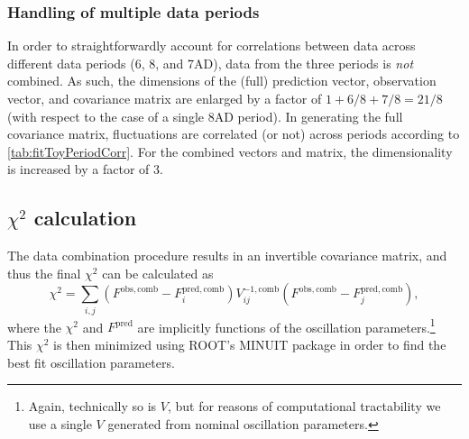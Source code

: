\documentclass[../thesis.tex]{subfiles}
\begin{document}
\subsubsection{Handling of multiple data periods}

In order to straightforwardly account for correlations between data across different data periods (6, 8, and 7AD), data from the three periods is \emph{not} combined. As such, the dimensions of the (full) prediction vector, observation vector, and covariance matrix are enlarged by a factor of $1 + 6/8 + 7/8 = 21/8$ (with respect to the case of a single 8AD period). In generating the full covariance matrix, fluctuations are correlated (or not) across periods according to \autoref{tab:fitToyPeriodCorr}. For the combined vectors and matrix, the dimensionality is increased by a factor of 3.

\begin{comment}
What do we ultimately get? Check P14A technote. 2 (near sites) x 3 (periods) = 4 predictions, over 37 energy bins. Size of covariance matrix is thus 37 x 2 x 3.
\end{comment}

\begin{comment}
Data is summed across all ADs in each near site.
\end{comment}

\begin{comment}
The far site prediction is summed across the four far ADs.
\end{comment}

\begin{comment}
The far site data is summed across the four far ADs.
\end{comment}

\begin{comment}
See CombineMatrix in Predictor.cc.
\end{comment}

\begin{comment}
Correlations are implemented at the level of the toy MC.
\end{comment}
\subsection{$\chi^2$ calculation}
\label{sec:fitChi2}

The data combination procedure results in an invertible covariance matrix, and thus the final $\chi^2$ can be calculated as
\begin{equation*}
  \chi^2 = \sum_{i,j} (F^{\mathrm{obs},\mathrm{comb}} - F^{\mathrm{pred},\mathrm{comb}}_i) V^{-1,\mathrm{comb}}_{ij} (F^{\mathrm{obs},\mathrm{comb}} - F^{\mathrm{pred},\mathrm{comb}}_j),
\end{equation*}
where the $\chi^2$ and $F^{\mathrm{pred}}$ are implicitly functions of the oscillation parameters.\footnote{Again, technically so is $V$, but for reasons of computational tractability we use a single $V$ generated from nominal oscillation parameters.} This $\chi^2$ is then minimized using ROOT's MINUIT package in order to find the best fit oscillation parameters.
\end{document}
